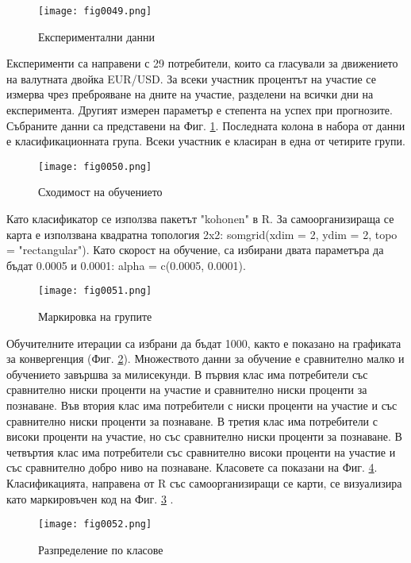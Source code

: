 \begin{figure}[H]
  \centering
  \texttt{[image: fig0049.png]}
  \caption{Експериментални данни}
\label{fig0049}
\end{figure}

Експерименти са направени с 29 потребители, които са гласували за движението на валутната двойка EUR/USD. За всеки участник процентът на участие се измерва чрез преброяване на дните на участие, разделени на всички дни на експеримента. Другият измерен параметър е степента на успех при прогнозите. Събраните данни са представени на Фиг. \ref{fig0049}. Последната колона в набора от данни е класификационната група. Всеки участник е класиран в една от четирите групи.

\begin{figure}[H]
  \centering
  \texttt{[image: fig0050.png]}
  \caption{Сходимост на обучението}
\label{fig0050}
\end{figure}

Като класификатор се използва пакетът "kohonen" в R. За самоорганизираща се карта е използвана квадратна топология 2x2: somgrid(xdim = 2, ydim = 2, topo = "rectangular"). Като скорост на обучение, са избирани двата параметъра да бъдат 0.0005 и 0.0001: alpha = c(0.0005, 0.0001).

\begin{figure}[H]
  \centering
  \texttt{[image: fig0051.png]}
  \caption{Маркировка на групите}
\label{fig0051}
\end{figure}

Обучителните итерации са избрани да бъдат 1000, както е показано на графиката за конвергенция (Фиг. \ref{fig0050}). Множеството данни за обучение е сравнително малко и обучението завършва за милисекунди. В първия клас има потребители със сравнително ниски проценти на участие и сравнително ниски проценти за познаване. Във втория клас има потребители с ниски проценти на участие и със сравнително ниски проценти за познаване. В третия клас има потребители с високи проценти на участие, но със сравнително ниски проценти за познаване. В четвъртия клас има потребители със сравнително високи проценти на участие и със сравнително добро ниво на познаване. Класовете са показани на Фиг. \ref{fig0052}. Класификацията, направена от R със самоорганизиращи се карти, се визуализира като маркировъчен код на Фиг. \ref{fig0051} \cite{Tomov-03}.

\begin{figure}[H]
  \centering
  \texttt{[image: fig0052.png]}
  \caption{Разпределение по класове}
\label{fig0052}
\end{figure}

